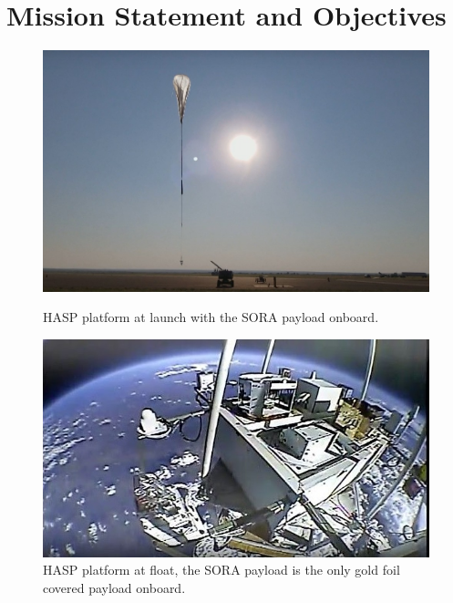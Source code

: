 \section{Mission Statement and Objectives}
\label{sec:Introduction}
 


\begin{figure}[h!]
  \begin{center}
    \begin{minipage}[c]{0.45\linewidth}
      \includegraphics[width=\textwidth]{./Figures/sora_takeoff.jpg}
      \caption{HASP platform at launch with the SORA payload onboard.}
      \label{fig:takeoff}
    \end{minipage}
    \hfill
    \begin{minipage}[c]{0.49\linewidth}
      \includegraphics[width=\textwidth]{./Figures/sora_flight.jpg}
      \caption{HASP platform at float, the SORA payload is the only gold foil covered payload onboard.}
      \label{fig:float}
    \end{minipage}
  \end{center}
\end{figure}

